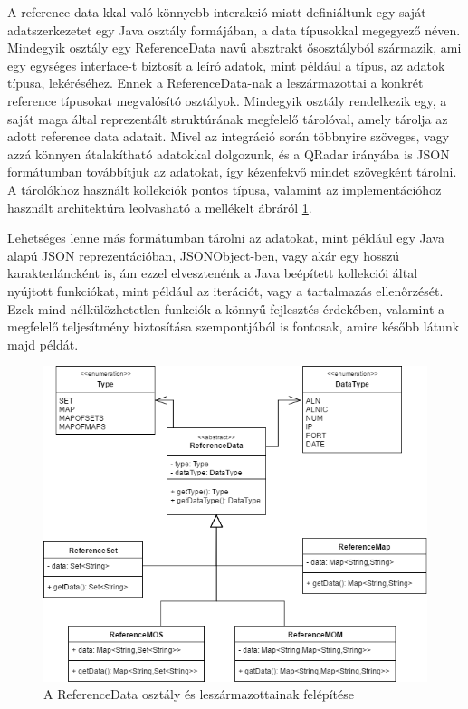 A reference data-kkal való könnyebb interakció miatt definiáltunk egy saját adatszerkezetet egy Java osztály formájában, a data típusokkal megegyező néven. Mindegyik osztály egy ReferenceData navű absztrakt ősosztályból származik, ami egy egységes interface-t biztosít a leíró adatok, mint például a típus, az adatok típusa, lekéréséhez. Ennek a ReferenceData-nak a leszármazottai a konkrét reference típusokat megvalósító osztályok. Mindegyik osztály rendelkezik egy, a saját maga által reprezentált struktúrának megfelelő tárolóval, amely tárolja az adott reference data adatait. Mivel az integráció során többnyire szöveges, vagy azzá könnyen átalakítható adatokkal dolgozunk, és a QRadar irányába is JSON formátumban továbbítjuk az adatokat, így kézenfekvő mindet szövegként tárolni. A tárolókhoz használt kollekciók pontos típusa, valamint az implementációhoz használt architektúra leolvasható a mellékelt ábráról \ref{fig:referencedata}. 

Lehetséges lenne más formátumban tárolni az adatokat, mint például egy Java alapú JSON reprezentációban, JSONObject-ben, vagy akár egy hosszú karakterláncként is, ám ezzel elvesztenénk a Java beépített kollekciói által nyújtott funkciókat, mint például az iterációt, vagy a tartalmazás ellenőrzését. Ezek mind nélkülözhetetlen funkciók a könnyű fejlesztés érdekében, valamint a megfelelő teljesítmény biztosítása szempontjából is fontosak, amire később látunk majd példát. 

\begin{figure}
	\centering
	\includegraphics[width=0.7\linewidth]{figures/ReferenceData}
	\caption{A ReferenceData osztály és leszármazottainak felépítése}
	\label{fig:referencedata}
\end{figure}

